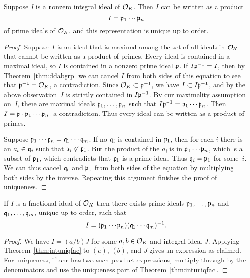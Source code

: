 \begin{theorem}\label{thm:intuniqfac}
	Suppose $I$ is a nonzero integral ideal of $\mathcal{O}_K$.  Then $I$ can
	be written as a product
	$$
		I = \mathfrak{p}_1\cdots \mathfrak{p}_n
	$$
	of prime ideals of $\mathcal{O}_K$, and this representation is unique up to
	order.
\end{theorem}
\begin{proof}
	Suppose~$I$ is an ideal that is maximal among the set of all ideals in
	$\mathcal{O}_K$ that cannot be written as a product of primes.  Every ideal is
	contained in a maximal ideal, so $I$ is contained in a nonzero prime
	ideal $\mathfrak{p}$.  If $I\mathfrak{p}^{-1} = I$, then by Theorem~\ref{thm:ddabgrp} we
	can cancel $I$ from both sides of this equation to see that
	$\mathfrak{p}^{-1}=\mathcal{O}_K$, a contradiction.  Since $\mathcal{O}_K\subset \mathfrak{p}^{-1}$,
	we have $I\subset I\mathfrak{p}^{-1}$, and by the above observation~$I$
	is strictly contained in $I\mathfrak{p}^{-1}$.
	By our maximality assumption on~$I$, there are maximal
	ideals $\mathfrak{p}_1,\ldots, \mathfrak{p}_n$ such that $I\mathfrak{p}^{-1} = \mathfrak{p}_1\cdots \mathfrak{p}_n$.
	Then $I=\mathfrak{p}\cdot \mathfrak{p}_1\cdots \mathfrak{p}_n$, a contradiction.  Thus every ideal
	can be written as a product of primes.
	
	Suppose $\mathfrak{p}_1\cdots \mathfrak{p}_n=\mathfrak{q}_1\cdots \mathfrak{q}_m$. If no $\mathfrak{q}_i$ is contained in
	$\mathfrak{p}_1$, then for each $i$ there is an $a_i\in \mathfrak{q}_i$ such that
	$a_i\not\in\mathfrak{p}_1$.  But the product of the $a_i$ is in $\mathfrak{p}_1\cdots
	\mathfrak{p}_n$, which is a subset of $\mathfrak{p}_1$, which contradicts that
	$\mathfrak{p}_1$ is a prime ideal.  Thus $\mathfrak{q}_i=\mathfrak{p}_1$ for some~$i$.  We can thus
	cancel $\mathfrak{q}_i$ and $\mathfrak{p}_1$ from both sides of the equation by multiplying
	both sides by the inverse.
	Repeating this argument finishes the proof of uniqueness.
\end{proof}

\begin{theorem}\label{thm:uniqfac}
	If $I$ is a fractional ideal of $\mathcal{O}_K$ then there exists
	prime ideals $\mathfrak{p}_1,\ldots, \mathfrak{p}_n$ and $\mathfrak{q}_1,\ldots, \mathfrak{q}_m$,
	unique up to order, such that
	$$
		I = (\mathfrak{p}_1\cdots \mathfrak{p}_n)(\mathfrak{q}_1\cdots \mathfrak{q}_m)^{-1}.
	$$
\end{theorem}
\begin{proof}
	We have $I=(a/b)J$ for some $a,b\in\mathcal{O}_K$ and integral ideal $J$.
	Applying Theorem~\ref{thm:intuniqfac} to $(a)$, $(b)$, and $J$ gives
	an expression as claimed.  For uniqueness, if one has two such product
	expressions, multiply through by the denominators and use the
	uniqueness part of Theorem~\ref{thm:intuniqfac}.
\end{proof}

